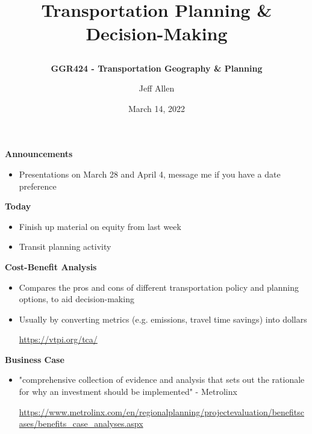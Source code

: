 \documentclass[aspectratio=169]{beamer}
\title{\textbf{Transportation Planning \& Decision-Making}
\subtitle{\textbf{GGR424 - Transportation Geography \& Planning}}
\author{Jeff Allen}
\institute{University of Toronto}
\date{March 14, 2022}}
\begin{document}
	
\begin{frame}
	\titlepage	
\end{frame}





\begin{frame}
	
	\textbf{Announcements}
	
	\begin{itemize}
		\item Presentations on March 28 and April 4, message me if you have a date preference 
	\end{itemize}
	
	
	\textbf{Today}
	
	\begin{itemize}
		\item Finish up material on equity from last week
		\item Transit planning activity
		
	\end{itemize}
\end{frame}




\begin{frame}
	
	\textbf{Cost-Benefit Analysis}
	
	\begin{itemize}
		\item Compares the pros and cons of different transportation policy and planning options, to aid decision-making
		\item Usually by converting metrics (e.g. emissions, travel time savings) into dollars
		
		\tiny\url{https://vtpi.org/tca/}
	\end{itemize}	
	
	\textbf{Business Case}
	
	\begin{itemize}
		\item "comprehensive
		collection of evidence and analysis
		that sets out the rationale for why an
		investment should be implemented" - Metrolinx
		
		\tiny\url{https://www.metrolinx.com/en/regionalplanning/projectevaluation/benefitscases/benefits_case_analyses.aspx}
	\end{itemize}
	
\end{frame}
\end{document}
